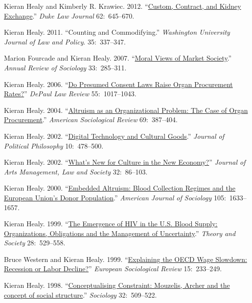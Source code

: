 \documentclass[11pt,oneside,a4paper,DIV=8]{scrartcl}
\begin{document}
Kieran Healy and Kimberly R. Krawiec. 2012. ``\href{http://kieranhealy.org/files/papers/custom-contract-kidney.pdf}{Custom, Contract, and Kidney Exchange}.'' \emph{Duke Law Journal} 62:~645--670.

Kieran Healy. 2011. ``Counting and Commodifying.'' \emph{Washington University Journal of Law and Policy}. 35:~337--347.

Marion Fourcade and Kieran Healy. 2007. ``\href{http://arjournals.annualreviews.org/doi/pdf/10.1146/annurev.soc.33.040406.131642}{Moral Views of Market Society}.'' \emph{Annual Review of Sociology} 33:~285--311. 

Kieran Healy. 2006. ``\href{http://www.kieranhealy.org/files/papers/presumed-consent.pdf}{Do Presumed Consent Laws Raise Organ Procurement Rates?}'' \emph{DePaul Law Review} 55:~1017--1043. 

Kieran Healy. 2004. ``\href{http://www.kieranhealy.org/files/papers/asr2004.pdf}{Altruism as an Organizational Problem: The Case of Organ Procurement}.''
 \emph{American Sociological Review} 69:~387--404.

Kieran Healy. 2002. ``\href{http://www.kieranhealy.org/files/papers/jpp.pdf}{Digital Technology and Cultural Goods}.'' \emph{Journal of
  Political Philosophy} 10:~478--500. 

Kieran Healy. 2002. ``\href{http://www.kieranhealy.org/files/papers/culture-newecon.pdf}{What's New for Culture in the New Economy?}'' \emph{Journal
  of Arts Management, Law and Society} 32:~86--103. 


Kieran Healy. 2000. ``\href{http://www.kieranhealy.org/files/papers/embed-alt.pdf}{Embedded Altruism: Blood Collection Regimes and the European
  Union's Donor Population}.'' \emph{American Journal of Sociology} 105:~1633--1657.


Kieran Healy. 1999.  ``\href{http://www.kieranhealy.org/files/papers/ts.pdf}{The Emergence of HIV in the U.S. Blood Supply: Organizations,
  Obligations and the Management of Uncertainty}.'' \emph{Theory and Society} 28:~529--558.


Bruce Western and Kieran Healy. 1999. ``\href{http://www.kieranhealy.org/files/papers/western-healy99.pdf}{Explaining the OECD Wage Slowdown:
Recession or Labor Decline?}''  \emph{European Sociological Review}
15:~233--249.


Kieran Healy. 1998.  ``\href{http://www.kieranhealy.org/files/papers/constraint98.pdf}{Conceptualising Constraint: Mouzelis, Archer and the concept of
  social structure}.'' \emph{Sociology} 32:~509--522. 
\end{document}
